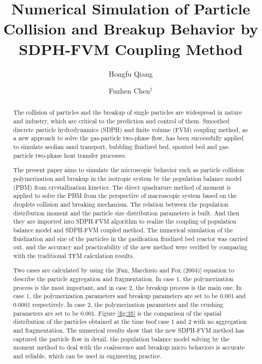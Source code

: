 \documentclass[10pt]{article}
\title{Numerical Simulation of Particle Collision and Breakup Behavior by SDPH-FVM Coupling Method}
\date{}
\author[$\relax$]{Hongfu Qiang}
\author[$\relax$]{Fuzhen Chen$^\dagger$}
\affil[$\relax$]{Department of Power Engineering, Xi'an Hi-Tech Institute, China}
\affil[$\relax$]{\href{mailto:chen_fu_zhen@163.com}{chen\_fu\_zhen@163.com}$^{\dagger}$}
\begin{document}
\maketitle


\begin{abstract}
The collision of particles and the breakup of single particles are widespread in nature and industry, which are critical to the prediction and control of them. Smoothed discrete particle hydrodynamics (SDPH) and finite volume (FVM) coupling method, as a new approach to solve the gas-particle two-phase flow, has been successfully applied to simulate aeolian sand transport, bubbling fluidized bed, spouted bed and gas-particle two-phase heat transfer processes.

The present paper aims to simulate the microscopic behavior such as particle collision polymerization and breakup in the isotropic system by the population balance model (PBM) from crystallization kinetics. The direct quadrature method of moment is applied to solve the PBM from the perspective of macroscopic system based on the droplets collision and breaking mechanism. The relation between the population distribution moment and the particle size distribution parameters is built. And then they are imported into SDPH-FVM algorithm to realize the coupling of population balance model and SDPH-FVM coupled method. The numerical simulation of the fluidization and size of the particles in the gasification fluidized bed reactor was carried out, and the accuracy and practicability of the new method were verified by comparing with the traditional TFM calculation results.

Two cases are calculated by using the [Fan, Marchisio and Fox (2004)] equation to describe the particle aggregation and fragmentation. In case 1, the polymerization process is the most important, and in case 2, the breakup process is the main one. In case 1, the polymerization parameters and breakup parameters are set to be 0.001 and 0.0001 respectively. In case 2, the polymerization parameters and the crushing parameters are set to be 0.001. Figure \ref{fig:35} is the comparison of the spatial distribution of the particles obtained at the time 6sof case 1 and 2 with no aggregation and fragmentation. The numerical results show that the new SDPH-FVM method has captured the particle flow in detail, the population balance model solving by the moment method to deal with the coalescence and breakup micro behaviors is accurate and reliable, which can be used in engineering practice.


\end{abstract}
\end{document}
